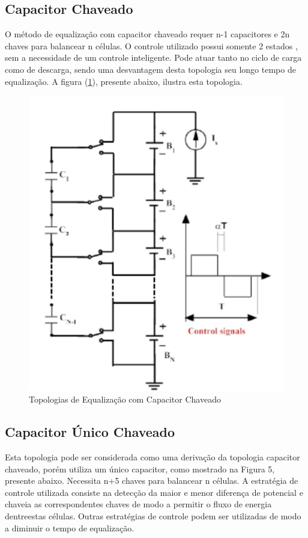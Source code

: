 \documentclass[11pt, a4paper, oneside]{article}
\begin{document}
\subsection{Capacitor Chaveado}
O método de equalização com capacitor chaveado requer n-1 capacitores e
2n chaves para balancear n células. O controle utilizado possui somente 2 estados ,
sem a necessidade de um controle inteligente. Pode atuar tanto no ciclo de carga
como de descarga, sendo uma desvantagem desta topologia seu longo tempo de
equalização. A figura (\ref{fig:estrutura_equalizador_passivo_ apacitor}), presente abaixo, ilustra esta topologia.

\begin{figure}[h!]
\centering
\includegraphics[width=0.6\linewidth]{topologia_equalizacao_capacitor_chaveado}
\caption{Topologias de Equalização com Capacitor Chaveado \cite{energy_figure}}
\label{fig:estrutura_equalizador_passivo_ apacitor}
\end{figure}

\subsection{Capacitor Único Chaveado}
Esta topologia pode ser considerada como uma derivação da topologia
capacitor chaveado, porém utiliza um único capacitor, como mostrado na Figura 5,
presente abaixo. Necessita n+5 chaves para balancear n células. A estratégia de
controle utilizada consiste na detecção da maior e menor diferença de potencial e
chaveia as correspondentes chaves de modo a permitir o fluxo de energia dentreestas células. 
Outras estratégias de controle podem ser utilizadas de modo a
diminuir o tempo de equalização.
\end{document}
